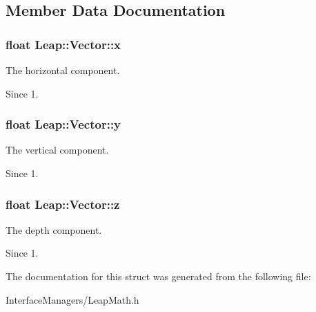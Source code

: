 \subsection{Member Data Documentation}
\hypertarget{struct_leap_1_1_vector_a58ab75fe089da2070f5dcef82c9a578a}{
\subsubsection[{x}]{\setlength{\rightskip}{0pt plus 5cm}float Leap\+::\+Vector\+::x}}\label{struct_leap_1_1_vector_a58ab75fe089da2070f5dcef82c9a578a}
The horizontal component. \begin{DoxySince}{Since}
1. 
\end{DoxySince}
\hypertarget{struct_leap_1_1_vector_abfff2f5b5c10d58a43cf377fc4cb9951}{
\subsubsection[{y}]{\setlength{\rightskip}{0pt plus 5cm}float Leap\+::\+Vector\+::y}}\label{struct_leap_1_1_vector_abfff2f5b5c10d58a43cf377fc4cb9951}
The vertical component. \begin{DoxySince}{Since}
1. 
\end{DoxySince}
\hypertarget{struct_leap_1_1_vector_aa44971ce01ce035e78ea557bc1e983a4}{
\subsubsection[{z}]{\setlength{\rightskip}{0pt plus 5cm}float Leap\+::\+Vector\+::z}}\label{struct_leap_1_1_vector_aa44971ce01ce035e78ea557bc1e983a4}
The depth component. \begin{DoxySince}{Since}
1. 
\end{DoxySince}


The documentation for this struct was generated from the following file\+:\begin{DoxyCompactItemize}
\item 
Interface\+Managers/Leap\+Math.\+h\end{DoxyCompactItemize}
